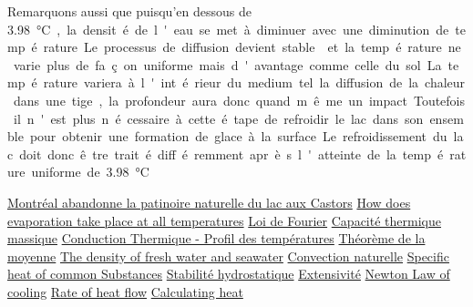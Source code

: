 \documentclass[12pt]{article}
\newcommand\critical{\SI{3.98}\celsius}
\begin{document}
Remarquons aussi que puisqu'en dessous de \critical, la densit\'e de l'eau se met \`a
diminuer avec une diminution de temp\'erature. Le processus de diffusion devient
stable~\cite{HydroStab} et la temp\'erature ne varie plus de fa\c con uniforme mais d'avantage comme
celle du sol. La temp\'erature variera \`a l'int\'erieur du medium tel la diffusion de la chaleur
dans une tige, la profondeur aura donc quand m\^eme un impact. Toutefois il n'est plus n\'ecessaire
\`a cette \'etape de refroidir le lac dans son ensemble pour obtenir une formation de glace \`a la
surface. Le refroidissement du lac doit donc \^etre trait\'e diff\'eremment apr\`es l'atteinte
de la temp\'erature uniforme de \critical.

\clearpage
\begin{thebibliography}{Xyz}
        \href{https://www.ledevoir.com/politique/montreal/517828/patinoire-du-lac-aux-castors}
            {Montr\'eal abandonne la patinoire naturelle du lac aux Castors}
     \href{https://www.quora.com/How-does-evaporation-take-place-at-all-temperatures-whereas-boiling-takes-place-at-a-fixed-temperature-under-a-given-pressure}
        {How does evaporation take place at all temperatures}
     \href{https://fr.wikipedia.org/wiki/Conduction_thermique#Loi_de_Fourier}
        {Loi de Fourier}
     \href{https://fr.wikipedia.org/wiki/Capacit%C3%A9_thermique_massique}
        {Capacit\'e thermique massique}
        \href{https://fr.wikipedia.org/wiki/Conduction_thermique#Surfaces_planes_en_série}
        {Conduction Thermique - Profil des temp\'eratures}
     \href{https://fr.wikipedia.org/wiki/Th%C3%A9or%C3%A8me_de_la_moyenne}
        {Th\'eor\`eme de la moyenne}
     \href{http://www.open.edu/openlearn/science-maths-technology/the-oceans/content-section-3.2}
        {The density of fresh water and seawater}
     \href{https://fr.wikipedia.org/wiki/Convection_thermique#Convection_naturelle}
        {Convection naturelle}
     \href{https://www.engineeringtoolbox.com/specific-heat-capacity-d_391.html}
        {Specific heat of common Substances}
     \href{https://fr.wikipedia.org/wiki/Gradient_thermique_adiabatique#Atmosph.C3.A8re_stable}
        {Stabilit\'e hydrostatique}
     \href{https://fr.wikipedia.org/wiki/Extensivit%C3%A9_et_intensivit%C3%A9_(physique)}
        {Extensivit\'e}
     \href{https://en.wikipedia.org/wiki/Newton%27s_law_of_cooling}
        {Newton Law of cooling}
     \href{https://en.wikipedia.org/wiki/Rate_of_heat_flow}
        {Rate of heat flow}
     \href{https://simple.wikipedia.org/wiki/Specific_heat#Usage}
        {Calculating heat}
\end{thebibliography}
\end{document}
